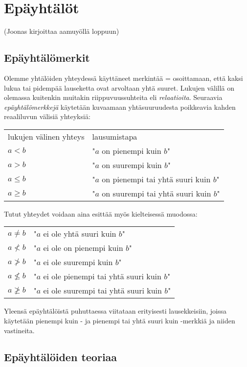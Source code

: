 \chapter{Epäyhtälöt}
(Joonas kirjoittaa aamuyöllä loppuun)

\section{Epäyhtälömerkit}

Olemme yhtälöiden yhteydessä käyttäneet merkintää = osoittamaan, että kaksi lukua tai pidempää lauseketta ovat arvoltaan yhtä suuret. Lukujen välillä on olemassa kuitenkin muitakin riippuvuussuhteita eli \emph{relaatioita}. Seuraavia \emph{epäyhtälömerkkejä} käytetään kuvaamaan yhtäsuuruudesta poikkeavia kahden reaaliluvun välisiä yhteyksiä:


\begin{tabular}{ll}
lukujen välinen yhteys & lausumistapa \\
$a<b$ &  "$a$ on pienempi kuin $b$"\\
$a>b$ & "$a$ on suurempi kuin $b$"\\
$a \leq b$ & "$a$ on pienempi tai yhtä suuri kuin $b$" \\
$a \geq b$ & "$a$ on suurempi tai yhtä suuri kuin $b$" \\
\end{tabular}

Tutut yhteydet voidaan aina esittää myös kielteisessä muodossa:

\begin{tabular}{ll}
$a\neq b$ & "$a$ ei ole yhtä suuri kuin $b$" \\
$a \nless b$ &  "$a$ ei ole on pienempi kuin $b$"\\
$a \ngtr b$ & "$a$ ei ole suurempi kuin $b$"\\
$a \nleq b$ & "$a$ ei ole pienempi tai yhtä suuri kuin $b$" \\
$a \ngeq b$ & "$a$ ei ole suurempi tai yhtä suuri kuin $b$" \\
\end{tabular}

Yleensä epäyhtälöistä puhuttaessa viitataan erityisesti lausekkeisiin, joissa käytetään pienempi kuin - ja pienempi tai yhtä suuri kuin -merkkiä ja niiden vastineita.

\section{Epäyhtälöiden teoriaa}

